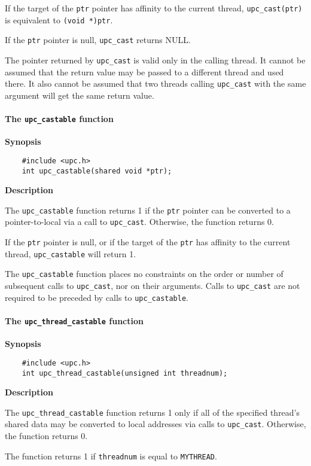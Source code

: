 \np If the target of the {\tt ptr} pointer has affinity to the current thread,
{\tt upc\_cast(ptr)} is equivalent to {\tt (void *)ptr}.

\np If the {\tt ptr} pointer is null, {\tt upc\_cast} returns NULL.

\np The pointer returned by {\tt upc\_cast} is valid only in the calling thread.  It
cannot be assumed that the return value may be passed to a different thread and used
there.  It also cannot be assumed that two threads calling {\tt upc\_cast} with the
same argument will get the same return value.

\paragraph{The {\tt upc\_castable} function}

{\bf Synopsis}

\npf\vspace{-2.5em}
\begin{verbatim}
    #include <upc.h>
    int upc_castable(shared void *ptr);
\end{verbatim}

{\bf Description}

The {\tt upc\_castable} function returns 1 if the {\tt ptr} pointer can be
converted to a pointer-to-local via a call to {\tt upc\_cast}.
Otherwise, the function returns 0.

If the {\tt ptr} pointer is null, or if the target of the {\tt ptr} has
affinity to the current thread, {\tt upc\_castable} will return 1.

The {\tt upc\_castable} function places no constraints on the order or
number of subsequent calls to {\tt upc\_cast}, nor on their arguments.
Calls to {\tt upc\_cast} are not required to be preceded by calls to
{\tt upc\_castable}.

\paragraph{The {\tt upc\_thread\_castable} function}

{\bf Synopsis}

\npf\vspace{-2.5em}
\begin{verbatim}
    #include <upc.h>
    int upc_thread_castable(unsigned int threadnum);
\end{verbatim}

{\bf Description}

The {\tt upc\_thread\_castable} function returns 1 only if all of the specified
thread's shared data may be converted to local addresses via calls to
{\tt upc\_cast}.  Otherwise, the function returns 0.

The function returns 1 if {\tt threadnum} is equal to {\tt MYTHREAD}.

\pagebreak
\appendix
